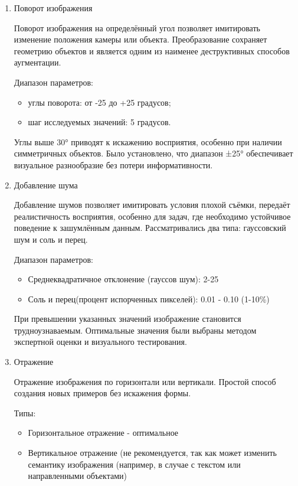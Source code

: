 \begin{enumerate}
	\item Поворот изображения

Поворот изображения на определённый угол позволяет имитировать изменение положения камеры или объекта. Преобразование сохраняет геометрию объектов и является одним из наименее деструктивных способов аугментации.

Диапазон параметров:
\begin{itemize}
	\item углы поворота: от -25 до +25 градусов;
	\item шаг исследуемых значений: 5 градусов.
\end{itemize}

Углы выше 30° приводят к искажению восприятия, особенно при наличии симметричных объектов. Было установлено, что диапазон ±25° обеспечивает визуальное разнообразие без потери информативности.


	\item Добавление шума
	
Добавление шумов позволяет имитировать условия плохой съёмки, передаёт реалистичность восприятия, особенно для задач, где необходимо устойчивое поведение к зашумлённым данным. Рассматривались два типа: гауссовский шум и соль и перец.

Диапазон параметров:
\begin{itemize}
	\item Среднеквадратичное отклонение (гауссов шум): 2-25
	\item Соль и перец(процент испорченных пикселей): 0.01 - 0.10 (1-10\%)
\end{itemize}

При превышении указанных значений изображение становится трудноузнаваемым. Оптимальные значения были выбраны методом экспертной оценки и визуального тестирования.


	\item Отражение
	
Отражение изображения по горизонтали или вертикали. Простой способ создания новых примеров без искажения формы.

Типы:

\begin{itemize}
	\item Горизонтальное отражение - оптимальное
	\item Вертикальное отражение (не рекомендуется, так как может изменить семантику изображения (например, в случае с текстом или направленными объектами)
\end{itemize}


\end{enumerate}

